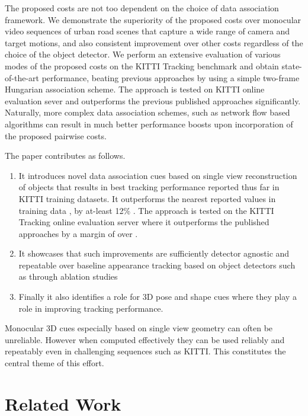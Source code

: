 \documentclass[letterpaper, 10 pt, conference]{ieeeconf}
\begin{document}
The proposed costs are not too dependent on the choice of data association framework. We demonstrate the superiority of the proposed costs over monocular video sequences of urban road scenes that capture a wide range of camera and target motions, and also consistent improvement over other costs regardless of the choice of the object detector. We perform an extensive evaluation of various modes of the proposed costs on the KITTI Tracking benchmark \cite{KITTI} and obtain state-of-the-art performance, beating previous approaches by using a simple two-frame Hungarian association scheme. The approach is tested on KITTI online evaluation sever and outperforms the previous published approaches significantly. Naturally, more complex data association schemes, such as network flow based algorithms \cite{NetFlow2008,DiscreteContinuous,gmmcp,followme} can result in much better performance boosts upon incorporation of the proposed pairwise costs.

The paper contributes as follows.
\begin{enumerate}
\item It introduces novel data association cues based on single view reconstruction of objects that results in best tracking performance reported thus far in KITTI training datasets. It outperforms the nearest reported values in training data \cite{choi2013,DeepNetworkFlow,NOMT}, by at-least 12\% . The approach is tested on the KITTI Tracking online evaluation server where it outperforms the published approaches by a margin of over .

\item It showcases that such improvements are sufficiently detector agnostic and repeatable over baseline appearance tracking based on object detectors such as \cite{RRC,SubCNN} through ablation studies

\item Finally it also identifies a role for 3D pose and shape cues where they play a role in improving tracking performance. 

\end{enumerate}

Monocular 3D cues especially based on single view geometry can often be unreliable. However when computed effectively they can be used reliably and repeatably even in challenging sequences such as KITTI. This constitutes the central theme of this effort.


\section{Related Work}
\end{document}
